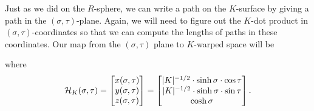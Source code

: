 \documentclass[newpage,hints,,12pt,noauthor,nooutcomes,handout]{ximera}
\begin{document}
Just as we did on the $R$-sphere, we can write a path on the
$K$-surface by giving a path in the $(\sigma,\tau)$-plane. Again, we
will need to figure out the $K$-dot product in
$(\sigma,\tau)$-coordinates so that we can compute the lengths of
paths in these coordinates. Our map from the $(\sigma,\tau)$ plane to $K$-warped space will be
\begin{center}
\end{center}
where
\[
\mathcal{H}_K(\sigma,\tau) = 
\begin{bmatrix}
x(\sigma,\tau)  \\
y(\sigma,\tau)  \\
z(\sigma,\tau)  
\end{bmatrix}
=
\begin{bmatrix}
  |K|^{-1/2}\cdot \sinh\sigma\cdot \cos \tau  \\
  |K|^{-1/2}\cdot \sinh\sigma\cdot \sin\tau\\
   \cosh \sigma \\
\end{bmatrix}.
\]
\end{document}
